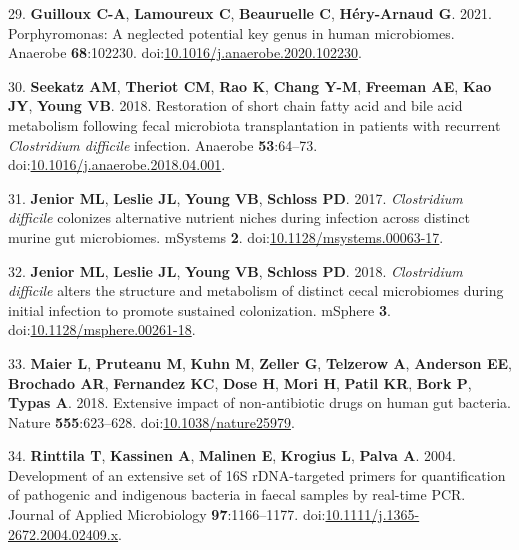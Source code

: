 \documentclass[
  12pt,
]{article}
\newenvironment{cslreferences}%
  {}%
  {\par}
\begin{document}
\begin{cslreferences}
\leavevmode\hypertarget{ref-Guilloux2021}{}%
29. \textbf{Guilloux C-A}, \textbf{Lamoureux C}, \textbf{Beauruelle C},
\textbf{Héry-Arnaud G}. 2021. Porphyromonas: A neglected potential key
genus in human microbiomes. Anaerobe \textbf{68}:102230.
doi:\href{https://doi.org/10.1016/j.anaerobe.2020.102230}{10.1016/j.anaerobe.2020.102230}.

\leavevmode\hypertarget{ref-Seekatz2018}{}%
30. \textbf{Seekatz AM}, \textbf{Theriot CM}, \textbf{Rao K},
\textbf{Chang Y-M}, \textbf{Freeman AE}, \textbf{Kao JY}, \textbf{Young
VB}. 2018. Restoration of short chain fatty acid and bile acid
metabolism following fecal microbiota transplantation in patients with
recurrent \emph{Clostridium difficile} infection. Anaerobe
\textbf{53}:64--73.
doi:\href{https://doi.org/10.1016/j.anaerobe.2018.04.001}{10.1016/j.anaerobe.2018.04.001}.

\leavevmode\hypertarget{ref-Jenior2017}{}%
31. \textbf{Jenior ML}, \textbf{Leslie JL}, \textbf{Young VB},
\textbf{Schloss PD}. 2017. \emph{Clostridium difficile} colonizes
alternative nutrient niches during infection across distinct murine gut
microbiomes. mSystems \textbf{2}.
doi:\href{https://doi.org/10.1128/msystems.00063-17}{10.1128/msystems.00063-17}.

\leavevmode\hypertarget{ref-Jenior2018}{}%
32. \textbf{Jenior ML}, \textbf{Leslie JL}, \textbf{Young VB},
\textbf{Schloss PD}. 2018. \emph{Clostridium difficile} alters the
structure and metabolism of distinct cecal microbiomes during initial
infection to promote sustained colonization. mSphere \textbf{3}.
doi:\href{https://doi.org/10.1128/msphere.00261-18}{10.1128/msphere.00261-18}.

\leavevmode\hypertarget{ref-Maier2018}{}%
33. \textbf{Maier L}, \textbf{Pruteanu M}, \textbf{Kuhn M},
\textbf{Zeller G}, \textbf{Telzerow A}, \textbf{Anderson EE},
\textbf{Brochado AR}, \textbf{Fernandez KC}, \textbf{Dose H},
\textbf{Mori H}, \textbf{Patil KR}, \textbf{Bork P}, \textbf{Typas A}.
2018. Extensive impact of non-antibiotic drugs on human gut bacteria.
Nature \textbf{555}:623--628.
doi:\href{https://doi.org/10.1038/nature25979}{10.1038/nature25979}.

\leavevmode\hypertarget{ref-Rinttila2004}{}%
34. \textbf{Rinttila T}, \textbf{Kassinen A}, \textbf{Malinen E},
\textbf{Krogius L}, \textbf{Palva A}. 2004. Development of an extensive
set of 16S rDNA-targeted primers for quantification of pathogenic and
indigenous bacteria in faecal samples by real-time PCR. Journal of
Applied Microbiology \textbf{97}:1166--1177.
doi:\href{https://doi.org/10.1111/j.1365-2672.2004.02409.x}{10.1111/j.1365-2672.2004.02409.x}.


\end{cslreferences}
\end{document}
